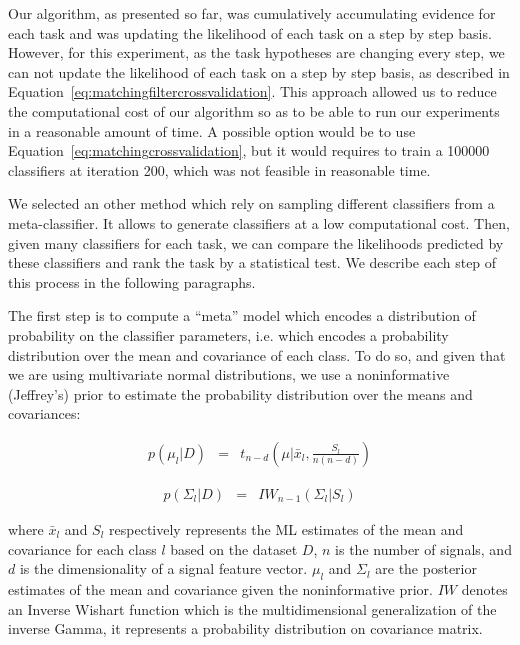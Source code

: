 Our algorithm, as presented so far, was cumulatively accumulating evidence for each task and was updating the likelihood of each task on a step by step basis. However, for this experiment, as the task hypotheses are changing every step, we can not update the likelihood of each task on a step by step basis, as described in Equation~\ref{eq:matchingfiltercrossvalidation}. This approach allowed us to reduce the computational cost of our algorithm so as to be able to run our experiments in a reasonable amount of time. A possible option would be to use Equation~\ref{eq:matchingcrossvalidation}, but it would requires to train a 100000 classifiers at iteration 200, which was not feasible in reasonable time.

We selected an other method which rely on sampling different classifiers from a meta-classifier. It allows to generate classifiers at a low computational cost. Then, given many classifiers for each task, we can compare the likelihoods predicted by these classifiers and rank the task by a statistical test. We describe each step of this process in the following paragraphs.

The first step is to compute a ``meta'' model which encodes a distribution of probability on the classifier parameters, i.e. which encodes a probability distribution over the mean and covariance of each class. To do so, and given that we are using multivariate normal distributions, we use a noninformative (Jeffrey's) prior \cite{gelman2003bayesian} to estimate the probability distribution over the means and covariances:

\begin{eqnarray}
p(\mu_l|D) & = & t_{n-d}(\mu| \bar{x}_l, \frac{S_l}{n(n-d)})
\label{eq:jeffreysmean}
\end{eqnarray}

\begin{eqnarray}
p(\Sigma_l|D) & = & IW_{n-1}(\Sigma_l | S_l)
\label{eq:jeffreyscov}
\end{eqnarray}

where $\bar{x}_l$ and $S_l$ respectively represents the ML estimates of the mean and covariance for each class $l$ based on the dataset $D$, $n$ is the number of signals, and $d$ is the dimensionality of a signal feature vector.
$\mu_l$ and $\Sigma_l$ are the posterior estimates of the mean and covariance given the noninformative prior. $IW$ denotes an Inverse Wishart function which is the multidimensional generalization of the inverse Gamma, it represents a probability distribution on covariance matrix.

